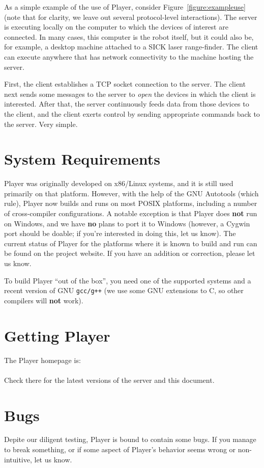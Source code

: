 \documentclass[11pt]{report}
\def\HOMEPAGE {{\tt http://playerstage.sourceforge.net}}
\begin{document}
As a simple example of the use of Player, consider
Figure~\ref{figure:exampleuse} (note that for clarity, we leave out several
protocol-level interactions).  The server is executing locally on the computer
to which the devices of interest are connected.  In many cases, this computer
is the robot itself, but it could also be, for example, a desktop machine
attached to a SICK laser range-finder.  The client can execute anywhere that
has network connectivity to the machine hosting the server.

First, the client establishes a TCP socket connection to the server.
The client next sends some messages to the server to {\em open} the devices
in which the client is interested.  After that, the server continuously
feeds data from those devices to the client, and the client exerts control
by sending appropriate commands back to the server.  Very simple.


\section{System Requirements}
\label{sect:sysreq}
Player was originally developed on x86/Linux systems, and it is still used
primarily on that platform.  However, with the help of the GNU Autotools
(which rule), Player now builds and runs on most POSIX platforms,
including a number of cross-compiler configurations.  A notable exception
is that Player does {\bf not} run on Windows, and we have {\bf no}
plans to port it to Windows (however, a Cygwin port should be doable;
if you're interested in doing this, let us know).  The current status
of Player for the platforms where it is known to build and run can be
found on the project website. If you have an addition or correction,
please let us know.

To build Player ``out of the box'', you need one of the supported
systems and a recent version of GNU {\tt gcc/g++} (we use some GNU extensions to
C, so other compilers will {\bf not} work).

\section{Getting Player}
\label{sect:gettingplayer}
The Player homepage is:\\
\indent \HOMEPAGE\\
Check there for the latest versions of the server and this
document.

\section{Bugs}
Depite our diligent testing, Player is bound to contain some bugs.
If you manage to break something, or if some aspect of Player's behavior seems 
wrong or non-intuitive, let us know.  
\end{document}
